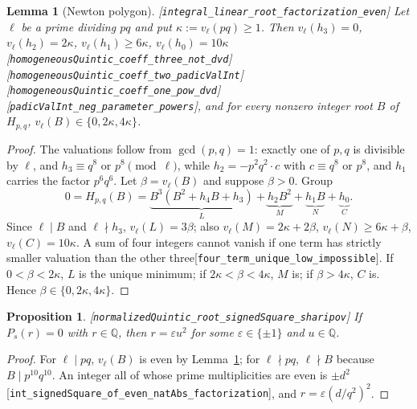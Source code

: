 \documentclass[10pt]{article}
\newtheorem{proposition}[theorem]{Proposition}
\newtheorem{lemma}[theorem]{Lemma}
\theoremstyle{definition}
\theoremstyle{remark}
\newcommand{\Q}{\mathbb{Q}}
\newcommand{\leanref}[1]{{\scriptsize\textup{[\texttt{#1}]}}\allowbreak}
\begin{document}
\begin{lemma}[Newton polygon]\label{lem:newton}
\leanref{integral\_\allowbreak linear\_\allowbreak root\_\allowbreak factorization\_\allowbreak even}
Let $\ell$ be a prime dividing $pq$ and put $\kappa:=v_\ell(pq)\ge1$.  Then
$v_\ell(h_3)=0$, $v_\ell(h_2)=2\kappa$, $v_\ell(h_1)\ge6\kappa$,
$v_\ell(h_0)=10\kappa$
\leanref{homogeneous\allowbreak Quintic\_\allowbreak coeff\_\allowbreak three\_\allowbreak not\_\allowbreak dvd} \leanref{homogeneous\allowbreak Quintic\_\allowbreak coeff\_\allowbreak two\_\allowbreak padic\allowbreak Val\allowbreak Int} \leanref{homogeneous\allowbreak Quintic\_\allowbreak coeff\_\allowbreak one\_\allowbreak pow\_\allowbreak dvd} \leanref{padic\allowbreak Val\allowbreak Int\_\allowbreak neg\_\allowbreak parameter\_\allowbreak powers},
and for every nonzero integer root $B$ of $H_{p,q}$, $v_\ell(B)\in\{0,2\kappa,4\kappa\}$.
\end{lemma}

\begin{proof}
The valuations follow from $\gcd(p,q)=1$: exactly one of $p,q$ is divisible
by $\ell$, and $h_3\equiv q^8$ or $p^8\pmod\ell$, while $h_2=-p^2q^2\cdot c$ with
$c\equiv q^8$ or $p^8$, and $h_1$ carries the factor $p^6q^6$.  Let
$\beta=v_\ell(B)$ and suppose $\beta>0$.  Group
\[
 0=H_{p,q}(B)=\underbrace{B^3(B^2+h_4B+h_3)}_{L}+\underbrace{h_2B^2}_{M}
 +\underbrace{h_1B}_{N}+\underbrace{h_0}_{C}.
\]
Since $\ell\mid B$ and $\ell\nmid h_3$, $v_\ell(L)=3\beta$; also
$v_\ell(M)=2\kappa+2\beta$, $v_\ell(N)\ge6\kappa+\beta$, $v_\ell(C)=10\kappa$.
A sum of four integers cannot vanish if one term has strictly smaller
valuation than the other three\leanref{four\_\allowbreak term\_\allowbreak unique\_\allowbreak low\_\allowbreak impossible}.
If $0<\beta<2\kappa$, $L$ is the unique minimum; if $2\kappa<\beta<4\kappa$,
$M$ is; if $\beta>4\kappa$, $C$ is.  Hence $\beta\in\{0,2\kappa,4\kappa\}$.
\end{proof}

\begin{proposition}\label{prop:signed-square-root}
\leanref{normalized\allowbreak Quintic\_\allowbreak root\_\allowbreak signed\allowbreak Square\_\allowbreak sharipov}
If $P_s(r)=0$ with $r\in\Q$, then $r=\varepsilon u^2$ for some
$\varepsilon\in\{\pm1\}$ and $u\in\Q$.
\end{proposition}

\begin{proof}
For $\ell\mid pq$, $v_\ell(B)$ is even by Lemma~\ref{lem:newton}; for
$\ell\nmid pq$, $\ell\nmid B$ because $B\mid p^{10}q^{10}$.  An integer all of
whose prime multiplicities are even is $\pm d^2$
\leanref{int\_\allowbreak signed\allowbreak Square\_\allowbreak of\_\allowbreak even\_\allowbreak nat\allowbreak Abs\_\allowbreak factorization}, and
$r=\varepsilon(d/q^2)^2$.
\end{proof}
\end{document}
